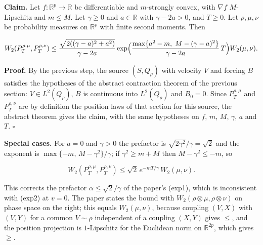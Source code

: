 \documentclass[11pt,a4paper]{article}
\begin{document}
\textbf{Claim.} Let \(f:\mathbb R^p\to\mathbb R\) be differentiable and \(m\)-strongly convex, with \(\nabla f\) \(M\)-Lipschitz and \(m\le M\). Let \(\gamma\ge0\) and \(a\in\mathbb R\) with \(\gamma-2a>0\), and \(T\ge0\). Let \(\rho,\mu,\nu\) be probability measures on \(\mathbb R^p\) with finite second moments. Then


\[W_2(P^{\rho,\mu}_T,P^{\rho,\nu}_T)\le\frac{\sqrt{2((\gamma-a)^2+a^2)}}{\gamma-2a}\exp\Bigl(\frac{\max\{a^2-m,\;M-(\gamma-a)^2\}}{\gamma-2a}\,T\Bigr)W_2(\mu,\nu).\]


\textbf{Proof.} By the previous step, the source \((S,Q_\rho)\) with velocity \(V\) and forcing \(B\) satisfies the hypotheses of the abstract contraction theorem of the previous section: \(V\in L^2(Q_\rho)\), \(B\) is continuous into \(L^2(Q_\rho)\) and \(B_0=0\). Since \(P^{\rho,\mu}_T\) and \(P^{\rho,\nu}_T\) are by definition the position laws of that section for this source, the abstract theorem \cite[Section~3.19.4]{LangevinLean2026Kinetic} gives the claim, with the same hypotheses on \(f\), \(m\), \(M\), \(\gamma\), \(a\) and \(T\). \(\square\)




\textbf{Special cases.} For \(a=0\) and \(\gamma>0\) the prefactor is \(\sqrt{2\gamma^2}/\gamma=\sqrt2\) and the exponent is \(\max\{-m,\,M-\gamma^2\}/\gamma\); if \(\gamma^2\ge m+M\) then \(M-\gamma^2\le-m\), so


\[W_2(P^{\rho,\mu}_T,P^{\rho,\nu}_T)\le\sqrt2\,e^{-mT/\gamma}\,W_2(\mu,\nu).\]


This corrects the prefactor \(\alpha\le\sqrt2/\gamma\) of the paper's (exp1), which is inconsistent with (exp2) at \(v=0\). The paper states the bound with \(W_2(\rho\otimes\mu,\rho\otimes\nu)\) on phase space on the right; this equals \(W_2(\mu,\nu)\), because coupling \((V,X)\) with \((V,Y)\) for a common \(V\sim\rho\) independent of a coupling \((X,Y)\) gives \(\le\), and the position projection is \(1\)-Lipschitz for the Euclidean norm on \(\mathbb R^{2p}\), which gives \(\ge\).
\end{document}
